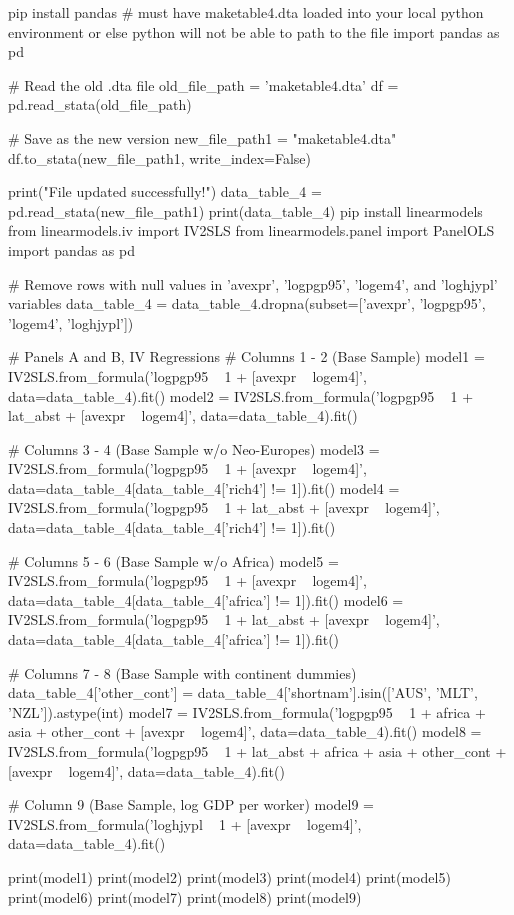 pip install pandas
# must have maketable4.dta loaded into your local python environment or else python will not be able to path to the file 
import pandas as pd

# Read the old .dta file
old_file_path = 'maketable4.dta'
df = pd.read_stata(old_file_path)

# Save as the new version
new_file_path1 = "maketable4.dta"
df.to_stata(new_file_path1, write_index=False)

print("File updated successfully!")
data_table_4 = pd.read_stata(new_file_path1)
print(data_table_4)
pip install linearmodels
from linearmodels.iv import IV2SLS
from linearmodels.panel import PanelOLS
import pandas as pd

# Remove rows with null values in 'avexpr', 'logpgp95', 'logem4', and 'loghjypl' variables
data_table_4 = data_table_4.dropna(subset=['avexpr', 'logpgp95', 'logem4', 'loghjypl'])

# Panels A and B, IV Regressions
# Columns 1 - 2 (Base Sample)
model1 = IV2SLS.from_formula('logpgp95 ~ 1 + [avexpr ~ logem4]', data=data_table_4).fit()
model2 = IV2SLS.from_formula('logpgp95 ~ 1 + lat_abst + [avexpr ~ logem4]', data=data_table_4).fit()

# Columns 3 - 4 (Base Sample w/o Neo-Europes)
model3 = IV2SLS.from_formula('logpgp95 ~ 1 + [avexpr ~ logem4]', data=data_table_4[data_table_4['rich4'] != 1]).fit()
model4 = IV2SLS.from_formula('logpgp95 ~ 1 + lat_abst + [avexpr ~ logem4]', data=data_table_4[data_table_4['rich4'] != 1]).fit()

# Columns 5 - 6 (Base Sample w/o Africa)
model5 = IV2SLS.from_formula('logpgp95 ~ 1 + [avexpr ~ logem4]', data=data_table_4[data_table_4['africa'] != 1]).fit()
model6 = IV2SLS.from_formula('logpgp95 ~ 1 + lat_abst + [avexpr ~ logem4]', data=data_table_4[data_table_4['africa'] != 1]).fit()

# Columns 7 - 8 (Base Sample with continent dummies)
data_table_4['other_cont'] = data_table_4['shortnam'].isin(['AUS', 'MLT', 'NZL']).astype(int)
model7 = IV2SLS.from_formula('logpgp95 ~ 1 + africa + asia + other_cont + [avexpr ~ logem4]', data=data_table_4).fit()
model8 = IV2SLS.from_formula('logpgp95 ~ 1 + lat_abst + africa + asia + other_cont + [avexpr ~ logem4]', data=data_table_4).fit()

# Column 9 (Base Sample, log GDP per worker)
model9 = IV2SLS.from_formula('loghjypl ~ 1 + [avexpr ~ logem4]', data=data_table_4).fit()

print(model1)
print(model2)
print(model3)
print(model4)
print(model5)
print(model6)
print(model7)
print(model8)
print(model9)